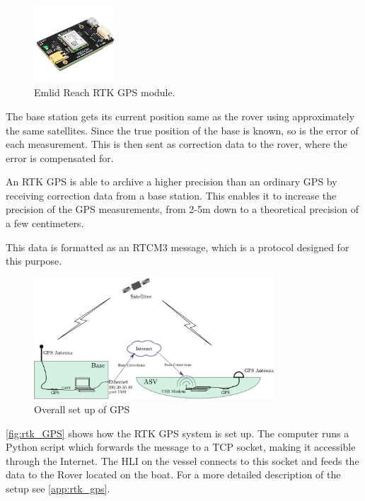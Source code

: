\begin{figure}[H]
  \includegraphics[width=0.27\textwidth]{figures/emlidReach}
  \caption{Emlid Reach RTK GPS module.\cite{EmlidReachDocs}}
  \label{fig:emlidReach}
\end{figure}

The base station gets its current position same as the rover using approximately the same satellites. Since the true position of the base is known, so is the error of each measurement. This is then sent as correction data to the rover, where the error is compensated for.%

An RTK GPS is able to archive a higher precision than an ordinary GPS by receiving correction data from a base station.
This enables it to increase the precision of the GPS measurements, from 2-5m down to a theoretical precision of a few centimeters.\cite{EmlidRTK}

This data is formatted as an RTCM3 message, which is a protocol designed for this purpose.
\begin{figure}[H]
	\includegraphics[width=0.8\textwidth]{figures/comunicationSetup.pdf}
	\caption{Overall set up of GPS}
	\label{fig:rtk_GPS}
\end{figure}
\autoref{fig:rtk_GPS} shows how the RTK GPS system is set up. 
The computer runs a Python script which forwards the message to a TCP socket, making it accessible through the Internet. 
The HLI on the vessel connects to this socket and feeds the data to the Rover located on the boat.
For a more detailed description of the setup see \autoref{app:rtk_gps}.
